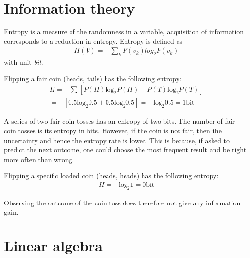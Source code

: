 \documentclass{report}
\begin{document}
\section{Information theory}
Entropy is a measure of the randomness in a variable, acquisition of information corresponds to a reduction in entropy. Entropy is defined as
\begin{align*}
H(V) = -\sum_k P(v_k)log_2 P(v_k)
\end{align*}
with unit {\em bit}.

Flipping a fair coin (heads, tails) has the following entropy:
\begin{align*}
H = -\sum[P(H)\mbox{log}_2P(H) + P(T)\mbox{log}_2P(T)] \\
= -[0.5\mbox{log}_2 0.5 + 0.5\mbox{log}_2 0.5] = -\mbox{log}_2 0.5 = 1\mbox{bit}
\end{align*}

A series of two fair coin tosses has an entropy of two bits. The number of fair coin tosses is its entropy in bits.
However, if the coin is not fair, then the uncertainty and hence the entropy rate is lower.
This is because, if asked to predict the next outcome, one could choose the most frequent result and be right more often than wrong.


Flipping a specific loaded coin (heads, heads) has the following entropy:
\begin{align*}
H = -\mbox{log}_2 1 = 0\mbox{bit}
\end{align*}

Observing the outcome of the coin toss does therefore not give any information gain.


\section{Linear algebra}
\end{document}

